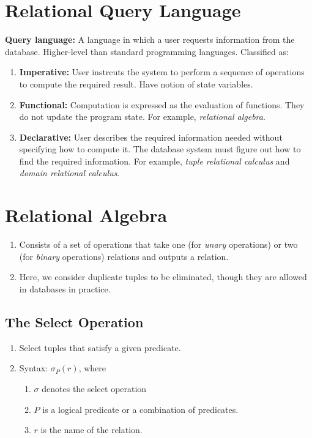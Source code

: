 \documentclass[journal,12pt,twocolumn]{IEEEtran}
\begin{document}
\section{Relational Query Language}
\textbf{Query language:} A language in which a user requests information from 
the database. Higher-level than standard programming languages. Classified as:
\begin{enumerate}
    \item \textbf{Imperative:} User instrcuts the system to perform a sequence 
    of operations to compute the required result. Have notion of state variables.
    \item \textbf{Functional:} Computation is expressed as the evaluation of 
    functions. They do not update the program state. For example, 
    \textit{relational algebra}.
    \item \textbf{Declarative:} User describes the required information needed 
    without specifying how to compute it. The database system must figure out 
    how to find the required information. For example, \textit{tuple relational
    calculus} and \textit{domain relational calculus}.
\end{enumerate}

\section{Relational Algebra}
\begin{enumerate}
    \item Consists of a set of operations that take one (for \textit{unary}
    operations) or two (for \textit{binary} operations) relations and outputs a
    relation.
    \item Here, we consider duplicate tuples to be eliminated, though they are 
    allowed in databases in practice.
\end{enumerate}

\subsection{The Select Operation}
\begin{enumerate}
    \item Select tuples that satisfy a given predicate.
    \item Syntax: $\sigma_{P}(r)$, where
    \begin{enumerate}
        \item $\sigma$ denotes the select operation
        \item $P$ is a logical predicate or a combination of predicates.
        \item $r$ is the name of the relation.
    \end{enumerate}
\end{enumerate}
\end{document}
